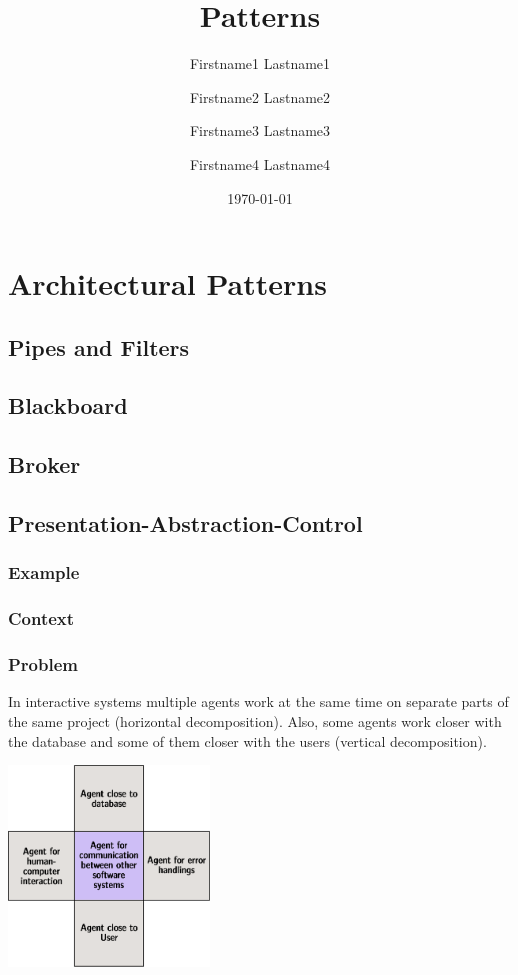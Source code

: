 \documentclass{scrbook}
\title{Patterns}
\author{Firstname1 Lastname1 \and Firstname2 Lastname2 \and Firstname3
Lastname3 \and Firstname4 Lastname4}
\date{\today}
\begin{document}
\frontmatter
\maketitle
\tableofcontents
\mainmatter
\part{Architectural Patterns}
\chapter{Pipes and Filters}
\chapter{Blackboard}
\chapter{Broker}

\chapter{Presentation-Abstraction-Control}

\section{Example}



\section{Context}

\section{Problem}

\begin{multicols}{2}
 



In interactive systems multiple agents work at the same time on separate parts of the same project
(horizontal decomposition). Also, some agents work closer with the database and some of them
closer with the users (vertical decomposition).


\begin{center}
 \includegraphics[width=0.4\textwidth]{./pics/problem.eps}\end{center}

\end{multicols}
\end{document}
